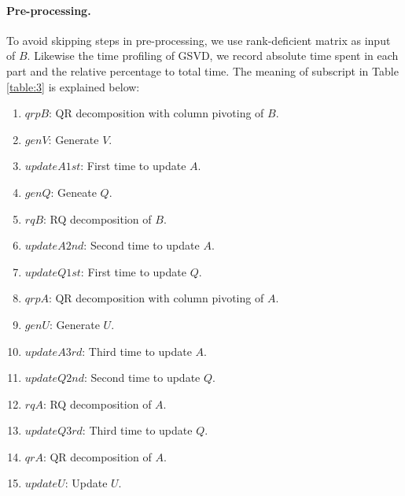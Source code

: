         \newpage
    
    \paragraph{Pre-processing.}To avoid skipping steps in pre-processing, we use rank-deficient matrix as input of $B$. Likewise the time profiling of GSVD, we record absolute time spent in each part and the relative percentage to total time. The meaning of subscript in Table \ref{table:3} is explained below:
    \begin{enumerate}
        \item $qrpB$: QR decomposition with column pivoting of $B$.
        \item $genV$: Generate $V$.
        \item $updateA1st$: First time to update $A$.
        \item $genQ$: Geneate $Q$.
        \item $rqB$: RQ decomposition of $B$.
        \item $updateA2nd$: Second time to update $A$.
        \item $updateQ1st$: First time to update $Q$.
        \item $qrpA$: QR decomposition with column pivoting of $A$.
        \item $genU$: Generate $U$.
        \item $updateA3rd$: Third time to update $A$.
        \item $updateQ2nd$: Second time to update $Q$.
        \item $rqA$: RQ decomposition of $A$.
        \item $updateQ3rd$: Third time to update $Q$.
        \item $qrA$: QR decomposition of $A$.
        \item $updateU$: Update $U$.
    \end{enumerate}
    
    \newpage
    
